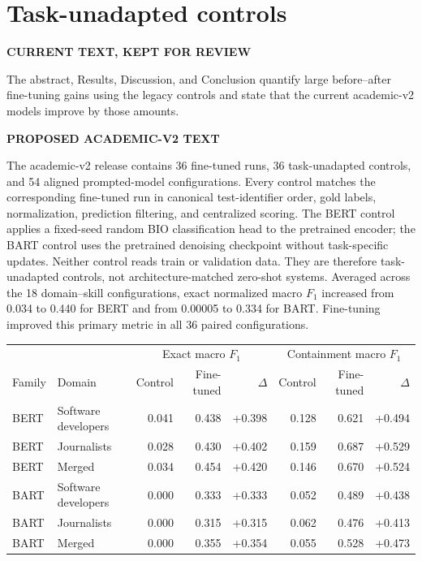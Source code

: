 \documentclass[11pt,a4paper]{article}
\newenvironment{OldBlock}
  {\definecolor{shadecolor}{RGB}{255,230,230}\begin{shaded}\begingroup\textbf{CURRENT TEXT, KEPT FOR REVIEW}\par\color{red!70!black}}
  {\endgroup\end{shaded}}
\newenvironment{NewBlock}
  {\definecolor{shadecolor}{RGB}{199,235,255}\begin{shaded}\begingroup\textbf{PROPOSED ACADEMIC-V2 TEXT}\par\color{newink}}
  {\endgroup\end{shaded}}
\begin{document}
\section{Task-unadapted controls}
\begin{OldBlock}
The abstract, Results, Discussion, and Conclusion quantify large before--after
fine-tuning gains using the legacy controls and state that the current
academic-v2 models improve by those amounts.
\end{OldBlock}
\begin{NewBlock}
The academic-v2 release contains 36 fine-tuned runs, 36 task-unadapted
controls, and 54 aligned prompted-model configurations. Every control matches
the corresponding fine-tuned run in canonical test-identifier order, gold
labels, normalization, prediction filtering, and centralized scoring. The
BERT control applies a fixed-seed random BIO classification head to the
pretrained encoder; the BART control uses the pretrained denoising checkpoint
without task-specific updates. Neither control reads train or validation data.
They are therefore task-unadapted controls, not architecture-matched zero-shot
systems. Averaged across the 18 domain--skill configurations, exact normalized
macro $F_1$ increased from 0.034 to 0.440 for BERT and from 0.00005 to 0.334
for BART. Fine-tuning improved this primary metric in all 36 paired
configurations.
\end{NewBlock}

\begin{center}
\scriptsize
\begin{tabular}{llrrrrrr}
\toprule
& & \multicolumn{3}{c}{Exact macro $F_1$} &
\multicolumn{3}{c}{Containment macro $F_1$} \\
Family & Domain & Control & Fine-tuned & $\Delta$ & Control & Fine-tuned & $\Delta$ \\
\midrule
BERT & Software developers & 0.041 & 0.438 & +0.398 & 0.128 & 0.621 & +0.494 \\
BERT & Journalists & 0.028 & 0.430 & +0.402 & 0.159 & 0.687 & +0.529 \\
BERT & Merged & 0.034 & 0.454 & +0.420 & 0.146 & 0.670 & +0.524 \\
BART & Software developers & 0.000 & 0.333 & +0.333 & 0.052 & 0.489 & +0.438 \\
BART & Journalists & 0.000 & 0.315 & +0.315 & 0.062 & 0.476 & +0.413 \\
BART & Merged & 0.000 & 0.355 & +0.354 & 0.055 & 0.528 & +0.473 \\
\bottomrule
\end{tabular}
\end{center}
\end{document}
